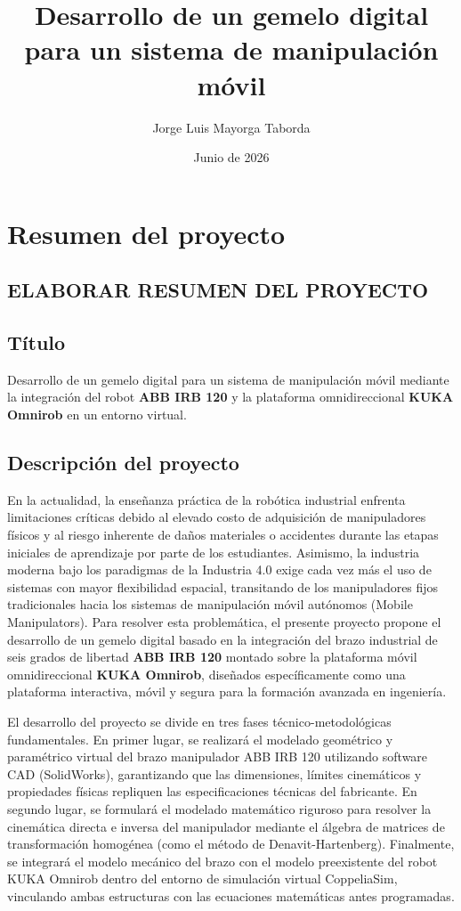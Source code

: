 \documentclass[11pt,oneside]{report}
\title{Desarrollo de un gemelo digital para un sistema de manipulación móvil}
\author{Jorge Luis Mayorga Taborda}
\date{Junio de 2026}
\begin{document}
\MakeVIUActivityTitle

\tableofcontents
\newpage

\chapter{Resumen del proyecto}

\section*{ELABORAR RESUMEN DEL PROYECTO}

\section{Título}

Desarrollo de un gemelo digital para un sistema de manipulación móvil mediante la integración del robot \textbf{ABB IRB 120} y la plataforma omnidireccional \textbf{KUKA Omnirob} en un entorno virtual.

\section{Descripción del proyecto}

En la actualidad, la enseñanza práctica de la robótica industrial enfrenta limitaciones críticas debido al elevado costo de adquisición de manipuladores físicos y al riesgo inherente de daños materiales o accidentes durante las etapas iniciales de aprendizaje por parte de los estudiantes. Asimismo, la industria moderna bajo los paradigmas de la Industria 4.0 exige cada vez más el uso de sistemas con mayor flexibilidad espacial, transitando de los manipuladores fijos tradicionales hacia los sistemas de manipulación móvil autónomos (Mobile Manipulators). Para resolver esta problemática, el presente proyecto propone el desarrollo de un gemelo digital basado en la integración del brazo industrial de seis grados de libertad \textbf{ABB IRB 120} montado sobre la plataforma móvil omnidireccional \textbf{KUKA Omnirob}, diseñados específicamente como una plataforma interactiva, móvil y segura para la formación avanzada en ingeniería.

El desarrollo del proyecto se divide en tres fases técnico-metodológicas fundamentales. En primer lugar, se realizará el modelado geométrico y paramétrico virtual del brazo manipulador ABB IRB 120 utilizando software CAD (SolidWorks), garantizando que las dimensiones, límites cinemáticos y propiedades físicas repliquen las especificaciones técnicas del fabricante. En segundo lugar, se formulará el modelado matemático riguroso para resolver la cinemática directa e inversa del manipulador mediante el álgebra de matrices de transformación homogénea (como el método de Denavit-Hartenberg). Finalmente, se integrará el modelo mecánico del brazo con el modelo preexistente del robot KUKA Omnirob dentro del entorno de simulación virtual CoppeliaSim, vinculando ambas estructuras con las ecuaciones matemáticas antes programadas.
\end{document}
